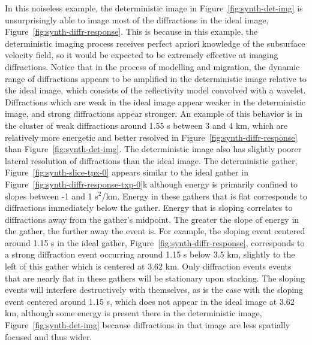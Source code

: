  


In this noiseless example, the deterministic image in Figure~\ref{fig:synth-det-img} is unsurprisingly able to image most of the diffractions in the ideal image, Figure~\ref{fig:synth-diffr-response}.  This is because in this example, the deterministic imaging process receives perfect apriori knowledge of the subsurface velocity field, so it would be expected to be extremely effective at imaging diffractions.  Notice that in the process of modelling and migration, the dynamic range of diffractions appears to be amplified in the deterministic image relative to the ideal image, which consists of the reflectivity model convolved with a wavelet.   Diffractions which are weak in the ideal image appear weaker in the deterministic image, and strong diffractions appear stronger.  An example of this behavior is in the cluster of weak diffractions around 1.55 s between 3 and 4 km, which are relatively more energetic and better resolved in Figure~\ref{fig:synth-diffr-response} than Figure~\ref{fig:synth-det-img}.  The deterministic image also has slightly poorer lateral resolution of diffractions than the ideal image.  The deterministic gather, Figure~\ref{fig:synth-slice-tpx-0} appears similar to the ideal gather in Figure~\ref{fig:synth-diffr-response-txp-0}k although energy is primarily confined to slopes between -1 and 1 s$^2$/km.  Energy in these gathers that is flat corresponds to diffractions immediately below the gather.  Energy that is sloping correlates to diffractions away from the gather's midpoint.  The greater the slope of energy in the gather, the further away the event is.  For example, the sloping event centered around 1.15 s in the ideal gather, Figure~\ref{fig:synth-diffr-response}, corresponds to a strong diffraction event occurring around 1.15 s below 3.5 km, slightly to the left of this gather which is centered at 3.62 km.  Only diffraction events events that are nearly flat in these gathers will be stationary upon stacking.  The sloping events will interfere destructively with themselves, as is the case with the sloping event centered around 1.15 s, which does not appear in the ideal image at 3.62 km, although some energy is present there in the deterministic image, Figure~\ref{fig:synth-det-img} because diffractions in that image are less spatially focused and thus wider.  


